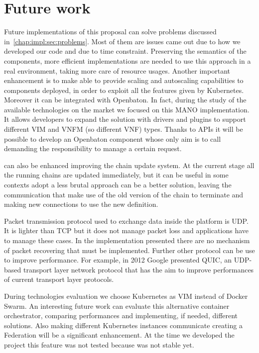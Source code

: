 \chapter{Future work}
\label{chap:future}

Future implementations of this proposal can solve problems discussed
in~\ref{chap:impl:sec:problems}. Most of them are issues came out due to how we
developed our code and due to time constraint. Preserving the semantics of the
components, more efficient implementations are needed to use this approach in
a real environment, taking more care of resource usages. Another important
enhancement is to make \harbor{} able to provide scaling and autoscaling
capabilities to components deployed, in order to exploit all the features given
by Kubernetes. Moreover it can be integrated with Openbaton. In fact, during the
study of the available technologies on the market we focused on this MANO
implementation. It allows developers to expand the solution with drivers and
plugins to support different VIM and VNFM (so different VNF) types. Thanks to
\harbor{} APIs it will be possible to develop an Openbaton component whose only
aim is to call \harbor{} demanding the responsibility to manage a certain
request. 

\harbor{} can also be enhanced improving the chain update system. At the current
stage all the running chains are updated immediately, but it can be useful in
some contexts adopt a less brutal approach can be a better solution, leaving
the communication that make use of the old version of the chain to terminate
and making new connections to use the new definition.

Packet transmission protocol used to exchange data inside the platform is UDP.
It is lighter than TCP but it does not manage packet loss and applications have
to manage these cases. In the implementation presented there are no mechanism of
packet recovering that must be implemented. Further other protocol can be use to
improve performance. For example, in 2012 Google presented QUIC, an UDP-based
transport layer network protocol that has the aim to improve performances of
current transport layer protocols.

During technologies evaluation we choose Kubernetes as VIM instead of Docker
Swarm. An interesting future work can evaluate this alternative container
orchestrator, comparing performances and implementing, if needed, different
solutions. Also making different Kubernetes instances communicate creating
a Federation will be a significant enhancement. At the time we developed the
project this feature was not tested because was not stable yet.

